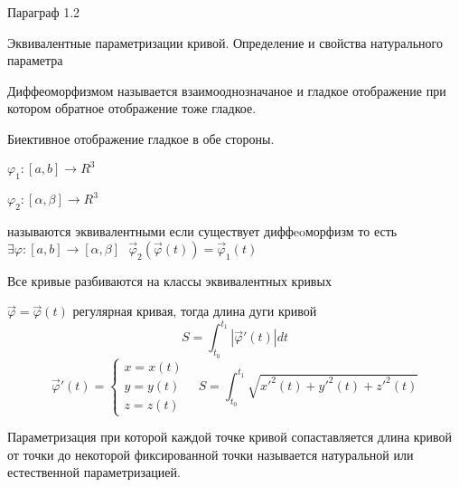 \begin{title}[\Large]
  Параграф 1.2
\end{title}

\begin{title}[\Large]
  Эквивалентные параметризации кривой. Определение и свойства натурального
  параметра
\end{title}

\begin{define}[диффеоморфизма]
  Диффеоморфизмом называется взаимооднозначаное и гладкое отображение при
  котором обратное отображение тоже гладкое.

  Биективное отображение гладкое в обе стороны.
\end{define}

\begin{define}
  $\varphi_1 : [a,b] \to R^3$

  $\varphi_2 : [\alpha, \beta] \to R^3$

  называются эквивалентными если существует диффeoморфизм то есть
  $\exists \varphi : [a,b] \to [\alpha, \beta] ~~~ \vec \varphi_2
  (\vec \varphi(t)) = \vec \varphi_1(t)$

  Все кривые разбиваются на классы эквивалентных кривых
\end{define}

\begin{block}
  $\vec \varphi = \vec \varphi(t)$ регулярная кривая, тогда длина дуги кривой
  $$
  S = \int_{t_0}^{t_1} | \vec \varphi'(t)| dt
  $$
  $$
  \vec \varphi'(t) =
  \left\{
  \begin{array}{c}
    x = x(t) \\
    y = y(t) \\
    z = z(t)
  \end{array}
  \right. ~~~~
  S = \int_{t_0}^{t_1} \sqrt{ x'^2(t) + y'^2(t) + z'^2(t)}
  $$
\end{block}

\begin{define}
  Параметризация при которой каждой точке кривой сопаставляется длина
  кривой от точки до некоторой фиксированной точки называется натуральной или
  естественной параметризацией.
\end{define}

